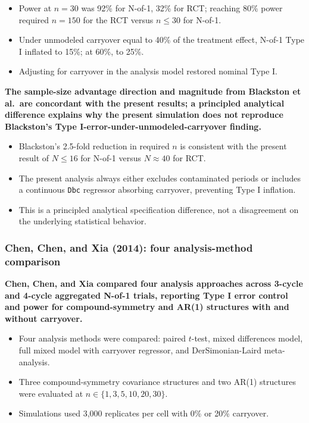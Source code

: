 \documentclass[
  11pt,
]{article}
\begin{document}
\begin{itemize}\setlength{\itemsep}{2pt}\setlength{\parskip}{0pt}
\item Power at $n = 30$ was 92\% for N-of-1, 32\% for RCT; reaching 80\% power required $n = 150$ for the RCT versus $n \le 30$ for N-of-1.
\item Under unmodeled carryover equal to 40\% of the treatment effect, N-of-1 Type I inflated to 15\%; at 60\%, to 25\%.
\item Adjusting for carryover in the analysis model restored nominal Type I.
\end{itemize}

\textbf{The sample-size advantage direction and magnitude from Blackston et al.\ are concordant with the present results; a principled analytical difference explains why the present simulation does not reproduce Blackston's Type I-error-under-unmodeled-carryover finding.}

\begin{itemize}\setlength{\itemsep}{2pt}\setlength{\parskip}{0pt}
\item Blackston's 2.5-fold reduction in required $n$ is consistent with the present result of $N \le 16$ for N-of-1 versus $N \approx 40$ for RCT.
\item The present analysis always either excludes contaminated periods or includes a continuous \texttt{Dbc} regressor absorbing carryover, preventing Type I inflation.
\item This is a principled analytical specification difference, not a disagreement on the underlying statistical behavior.
\end{itemize}

\subsubsection{Chen, Chen, and Xia (2014): four analysis-method comparison}\label{chen-chen-and-xia-2014-four-analysis-method-comparison}

\textbf{Chen, Chen, and Xia compared four analysis approaches across 3-cycle and 4-cycle aggregated N-of-1 trials, reporting Type I error control and power for compound-symmetry and AR(1) structures with and without carryover.}

\begin{itemize}\setlength{\itemsep}{2pt}\setlength{\parskip}{0pt}
\item Four analysis methods were compared: paired $t$-test, mixed differences model, full mixed model with carryover regressor, and DerSimonian-Laird meta-analysis.
\item Three compound-symmetry covariance structures and two AR(1) structures were evaluated at $n \in \{1, 3, 5, 10, 20, 30\}$.
\item Simulations used 3,000 replicates per cell with 0\% or 20\% carryover.
\end{itemize}
\end{document}
